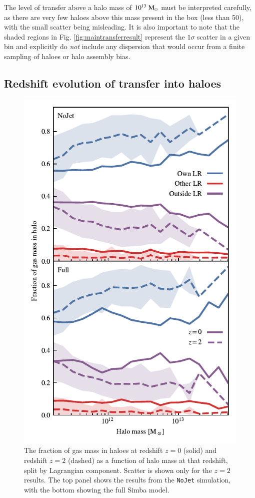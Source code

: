 \documentclass[fleqn,usenatbib]{mnras}
\newcommand{\msolar}{\;{\rm M}_{\odot}}
\newcommand{\simba}{{\sc Simba}}
\newcommand{\nojet}{{\tt NoJet}}
\begin{document}
The level of transfer above a halo mass of $10^{13} \msolar{}$ must be
interpreted carefully, as there are very few haloes above this mass present
in the box (less than 50), with the small scatter being misleading. It is
also important to note that the shaded regions in Fig.
\ref{fig:maintransferresult} represent the $1\sigma$ scatter in a given bin
and explicitly do \emph{not} include any dispersion that would occur from a
finite sampling of haloes or halo assembly bias.

\subsection{Redshift evolution of transfer into haloes}

\begin{figure}
    \centering
    \includegraphics[width=\columnwidth]{figures/component_fraction_multi_z.pdf}
    \vspace{-0.7cm}
    \caption{The fraction of gas mass in haloes at redshift $z=0$ (solid) and
    redshift $z=2$ (dashed) as a function of halo mass at that redshift, split by
    Lagrangian component. Scatter is shown only for the $z=2$ results. The top panel
    shows the results from the \nojet{} simulation, with the bottom showing the
    full \simba{} model.}
    \label{fig:ltzevo}
\end{figure}
\end{document}
